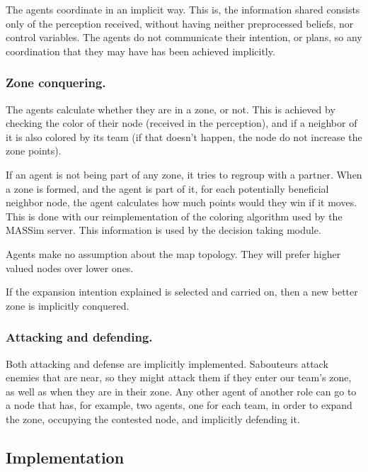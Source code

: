 \documentclass{llncs2e/llncs}
\begin{document}
    The agents coordinate in an implicit way. This is, the  information shared 
    consists only of the perception received, without having neither 
    preprocessed beliefs, nor control variables. The agents do not communicate
    their intention, or plans, so any coordination that they may have has been
    achieved implicitly.
    
\subsubsection{Zone conquering.}
    
    The agents calculate whether they are in a zone, or not. This is achieved
    by checking the color of their node (received in the perception), and if
    a neighbor of it is also colored by its team (if that doesn't happen, the
    node do not increase the zone points).
    
    If an agent is not being part of any zone, it tries to regroup with a 
    partner. 
    When a zone is formed, and the agent is part of it, for each potentially 
    beneficial neighbor node, the agent calculates how much points would they 
    win if it moves.
    This is done with our reimplementation of the coloring algorithm used by
    the MASSim server.
    This information is used by the decision taking module.
    
    Agents make no assumption about the map topology. They will prefer higher 
    valued nodes over lower ones.

    If the expansion intention explained is selected and carried on, then a new 
    better zone is implicitly conquered.

\subsubsection{Attacking and defending.}
    
    Both attacking and defense are implicitly implemented. Sabouteurs attack 
    enemies that are near, so they might attack them if they enter our team's 
    zone, as well as when they are in their zone. Any other agent of another role
    can go to a node that has, for example, two agents, one for each team, in order
    to expand the zone, occupying the contested node, and implicitly defending it.
    
\subsection{Implementation}
\end{document}
